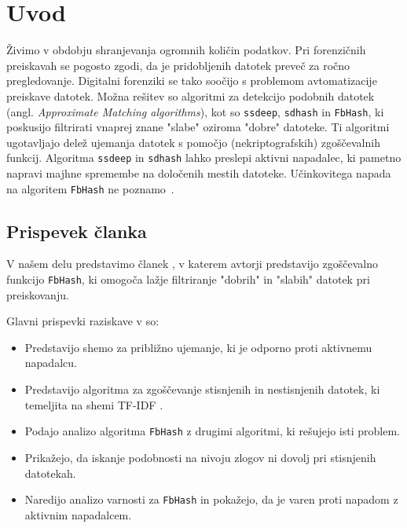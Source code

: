 \documentclass{acm_proc_article-sp}
\begin{document}


\section{Uvod}
Živimo v obdobju shranjevanja ogromnih količin podatkov. Pri forenzičnih preiskavah se pogosto zgodi, da je pridobljenih datotek preveč za ročno pregledovanje. Digitalni forenziki se tako soočijo s problemom avtomatizacije preiskave datotek. Možna rešitev so algoritmi za detekcijo podobnih datotek (angl. \emph{Approximate Matching algorithms}), kot so \texttt{ssdeep}, \texttt{sdhash} in \texttt{FbHash}, ki poskusijo filtrirati vnaprej znane "slabe" oziroma "dobre" datoteke. Ti algoritmi ugotavljajo delež ujemanja datotek s pomočjo (nekriptografskih) zgoščevalnih funkcij. Algoritma \texttt{ssdeep} in \texttt{sdhash} lahko preslepi aktivni napadalec, ki pametno napravi majhne spremembe na določenih mestih datoteke. Učinkovitega napada na algoritem \texttt{FbHash} ne poznamo~\cite{fbhash}.
\\
\subsection{Prispevek \v{c}lanka}

V našem delu predstavimo članek \cite{fbhash}, v katerem avtorji predstavijo zgoščevalno funkcijo \texttt{FbHash}, ki omogoča lažje filtriranje "dobrih" in "slabih" datotek pri preiskovanju. 

Glavni prispevki raziskave v \cite{fbhash} so:
\begin{itemize}
  \item Predstavijo shemo za približno ujemanje, ki je odporno proti aktivnemu napadalcu.
  \item Predstavijo algoritma za zgoščevanje stisnjenih in nestisnjenih datotek, ki temeljita na shemi TF-IDF \cite{Ramos_usingtf-idf}.
  \item Podajo analizo algoritma \texttt{FbHash} z drugimi algoritmi, ki rešujejo isti problem.
  \item Prikažejo, da iskanje podobnosti na nivoju zlogov ni dovolj pri stisnjenih datotekah.
  \item Naredijo analizo varnosti za \texttt{FbHash} in pokažejo, da je varen proti napadom z aktivnim napadalcem.
\end{itemize}
\end{document}
